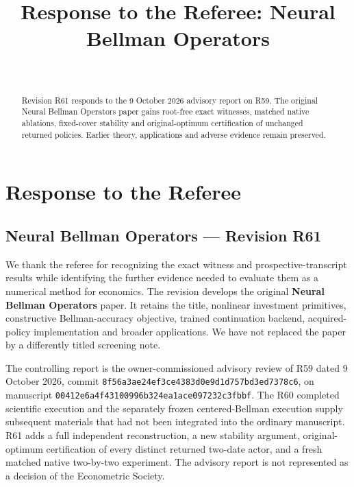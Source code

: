 \documentclass[ecta,nameyear,draft]{econsocart}
\begin{document}
\begin{frontmatter}
\title{Response to the Referee: Neural Bellman Operators}
\begin{aug}
\author[id=au1,addressref={add1}]{~}
\address[id=add1]{Peking University}
\end{aug}
\begin{abstract}Revision R61 responds to the 9 October 2026 advisory report on R59. The original Neural Bellman Operators paper gains root-free exact witnesses, matched native ablations, fixed-cover stability and original-optimum certification of unchanged returned policies. Earlier theory, applications and adverse evidence remain preserved.\end{abstract}
\end{frontmatter}
\hypertarget{response-to-the-referee}{%
\section{Response to the Referee}\label{response-to-the-referee}}

\hypertarget{neural-bellman-operators-revision-r61}{%
\subsection{Neural Bellman Operators --- Revision
R61}\label{neural-bellman-operators-revision-r61}}

We thank the referee for recognizing the exact witness and
prospective-transcript results while identifying the further evidence
needed to evaluate them as a numerical method for economics. The
revision develops the original \textbf{Neural Bellman Operators} paper.
It retains the title, nonlinear investment primitives, constructive
Bellman-accuracy objective, trained continuation backend,
acquired-policy implementation and broader applications. We have not
replaced the paper by a differently titled screening note.

The controlling report is the owner-commissioned advisory review of R59
dated 9 October 2026, commit
\nolinkurl{8f56a3ae24ef3ce4383d0e9d1d757bd3ed7378c6}, on manuscript
\nolinkurl{00412e6a4f43100996b324ea1ace097232c3fbbf}. The R60 completed
scientific execution and the separately frozen centered-Bellman
execution supply subsequent materials that had not been integrated into
the ordinary manuscript. R61 adds a full independent reconstruction, a
new stability argument, original-optimum certification of every distinct
returned two-date actor, and a fresh matched native two-by-two
experiment. The advisory report is not represented as a decision of the
Econometric Society.
\end{document}
